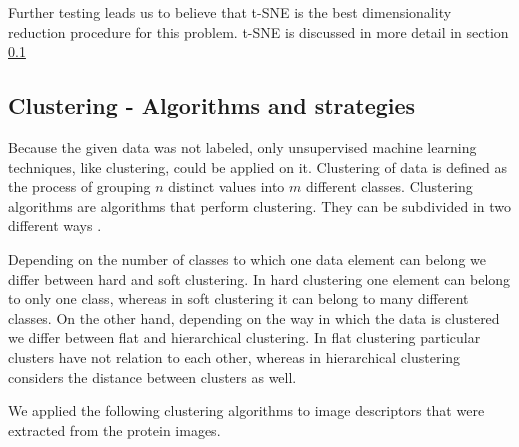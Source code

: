 \documentclass[journal]{vgtc}       %
\newcommand{\todo}[1]{\textcolor{red}{\textbf{TODO:} #1}}
\begin{document}
Further testing leads us to believe that t-SNE is the best dimensionality reduction procedure for this problem. t-SNE is discussed in more detail in section \ref{sec:clusteringa}


\subsection{Clustering - Algorithms and strategies }\label{sec:clusteringa}
Because the given data was not labeled, only unsupervised machine learning techniques, like clustering, could be applied on it. 
Clustering of data is defined as the process of grouping $n$ distinct values into $m$ different classes. Clustering algorithms are algorithms that perform clustering. They can be subdivided in two different ways \cite{iir}.

Depending on the number of classes to which one data element can belong we differ between hard and soft clustering. In hard clustering one element can belong to only one class, whereas in soft clustering it can belong to many different classes. 
On the other hand, depending on the way in which the data is clustered we differ between flat and hierarchical clustering. In flat clustering particular clusters have not relation to each other, whereas in hierarchical clustering considers the distance between clusters as well.

We applied the following clustering algorithms to image descriptors that were extracted from the protein images.
\end{document}
